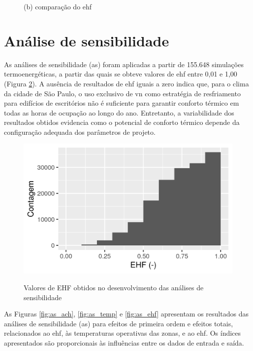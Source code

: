 \documentclass[brazil,hardcopy,openany]{ufscthesis} %
\begin{document}
\begin{figure}[h]
\begin{minipage}{.5\textwidth}
		\begin{center}
			\small{(b) comparação do \acrshort{ehf}}
		\end{center}
	\end{minipage}
	\label{fig:crack08}
\end{figure}

\newpage

\section{Análise de sensibilidade}

As análises de sensibilidade (\acrshort{as}) foram aplicadas a partir de 155.648 simulações termoenergéticas, a partir das quais se obteve valores de \acrshort{ehf} entre 0,01 e 1,00 (Figura \ref{fig:sobol_EHF}).
A ausência de resultados de \acrshort{ehf} iguais a zero indica que, para o clima da cidade de São Paulo, o uso exclusivo de \acrshort{vn} como estratégia de resfriamento para edifícios de escritórios não é suficiente para garantir conforto térmico em todas as horas de ocupação ao longo do ano. Entretanto, a variabilidade dos resultados obtidos evidencia como o potencial de conforto térmico depende da configuração adequada dos parâmetros de projeto.

\begin{figure}[h]
	\centering
	\caption{Valores de EHF obtidos no desenvolvimento das análises de sensibilidade}
	\includegraphics[width=.7\linewidth]{img/sobol_EHF.png}
	\label{fig:sobol_EHF}
\end{figure}

\newpage
As Figuras \ref{fig:as_ach}, \ref{fig:as_temp} e \ref{fig:as_ehf} apresentam os resultados das análises de sensibilidade (\acrshort{as}) para efeitos de primeira ordem e efeitos totais, relacionados ao \acrshort{ehf}, às temperaturas operativas das zonas, e ao \acrshort{ehf}. Os índices apresentados são proporcionais às influências entre os dados de entrada e saída.
\end{document}
